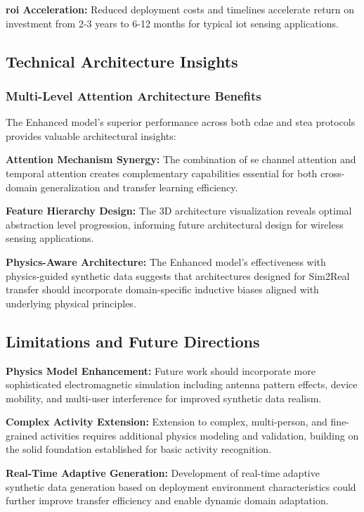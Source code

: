 \documentclass[journal]{IEEEtran}
\begin{document}
\textbf{\gls{roi} Acceleration:} Reduced deployment costs and timelines accelerate return on investment from 2-3 years to 6-12 months for typical \gls{iot} sensing applications.

\subsection{Technical Architecture Insights}

\subsubsection{Multi-Level Attention Architecture Benefits}

The Enhanced model's superior performance across both \gls{cdae} and \gls{stea} protocols provides valuable architectural insights:

\textbf{Attention Mechanism Synergy:} The combination of \gls{se} channel attention and temporal attention creates complementary capabilities essential for both cross-domain generalization and transfer learning efficiency.

\textbf{Feature Hierarchy Design:} The 3D architecture visualization reveals optimal abstraction level progression, informing future architectural design for wireless sensing applications.

\textbf{Physics-Aware Architecture:} The Enhanced model's effectiveness with physics-guided synthetic data suggests that architectures designed for Sim2Real transfer should incorporate domain-specific inductive biases aligned with underlying physical principles.

\subsection{Limitations and Future Directions}

\textbf{Physics Model Enhancement:} Future work should incorporate more sophisticated electromagnetic simulation including antenna pattern effects, device mobility, and multi-user interference for improved synthetic data realism.

\textbf{Complex Activity Extension:} Extension to complex, multi-person, and fine-grained activities requires additional physics modeling and validation, building on the solid foundation established for basic activity recognition.

\textbf{Real-Time Adaptive Generation:} Development of real-time adaptive synthetic data generation based on deployment environment characteristics could further improve transfer efficiency and enable dynamic domain adaptation.
\end{document}
